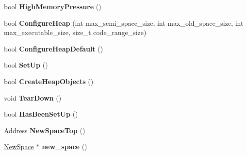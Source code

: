 \begin{DoxyCompactItemize}
\item 
bool {\bfseries High\+Memory\+Pressure} ()\hypertarget{classv8_1_1internal_1_1_heap_abe68dadf14e9f8d37cdec981d665c10c}{}\label{classv8_1_1internal_1_1_heap_abe68dadf14e9f8d37cdec981d665c10c}

\item 
bool {\bfseries Configure\+Heap} (int max\+\_\+semi\+\_\+space\+\_\+size, int max\+\_\+old\+\_\+space\+\_\+size, int max\+\_\+executable\+\_\+size, size\+\_\+t code\+\_\+range\+\_\+size)\hypertarget{classv8_1_1internal_1_1_heap_a80d91c0c3bdbe9e33076bf98a30dd027}{}\label{classv8_1_1internal_1_1_heap_a80d91c0c3bdbe9e33076bf98a30dd027}

\item 
bool {\bfseries Configure\+Heap\+Default} ()\hypertarget{classv8_1_1internal_1_1_heap_adc6be218f980e9f7388078766ff7bbb5}{}\label{classv8_1_1internal_1_1_heap_adc6be218f980e9f7388078766ff7bbb5}

\item 
bool {\bfseries Set\+Up} ()\hypertarget{classv8_1_1internal_1_1_heap_a9772d2151df2f7e7e4ebb92e2f6539bb}{}\label{classv8_1_1internal_1_1_heap_a9772d2151df2f7e7e4ebb92e2f6539bb}

\item 
bool {\bfseries Create\+Heap\+Objects} ()\hypertarget{classv8_1_1internal_1_1_heap_ac5c2b9915e1de6c40250fc82a58d2544}{}\label{classv8_1_1internal_1_1_heap_ac5c2b9915e1de6c40250fc82a58d2544}

\item 
void {\bfseries Tear\+Down} ()\hypertarget{classv8_1_1internal_1_1_heap_ab2deb2dc488bddc2a509e068fddcb89b}{}\label{classv8_1_1internal_1_1_heap_ab2deb2dc488bddc2a509e068fddcb89b}

\item 
bool {\bfseries Has\+Been\+Set\+Up} ()\hypertarget{classv8_1_1internal_1_1_heap_aad225fb00e461d862dd4ce44d6be2009}{}\label{classv8_1_1internal_1_1_heap_aad225fb00e461d862dd4ce44d6be2009}

\item 
Address {\bfseries New\+Space\+Top} ()\hypertarget{classv8_1_1internal_1_1_heap_a5201e67e7a9eff6f9f7c2dea9e4c2775}{}\label{classv8_1_1internal_1_1_heap_a5201e67e7a9eff6f9f7c2dea9e4c2775}

\item 
\hyperlink{classv8_1_1internal_1_1_new_space}{New\+Space} $\ast$ {\bfseries new\+\_\+space} ()\hypertarget{classv8_1_1internal_1_1_heap_ac478b09b843c03d566d054dba67a498e}{}\label{classv8_1_1internal_1_1_heap_ac478b09b843c03d566d054dba67a498e}


\end{DoxyCompactItemize}

